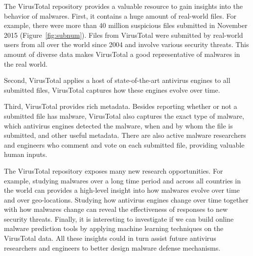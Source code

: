The VirusTotal repository provides a valuable resource to gain insights into 
the behavior of malwares.
%
First, it contains a huge amount of real-world files.
For example, there were more than 40 million suspicious files submitted in November 2015 (Figure~\ref{fig:subnum}). 
Files from VirusTotal were submitted by real-world users from all over the world since 2004
and involve various security threats. 
This amount of diverse data makes VirusTotal a good representative of malwares in the real world. 

Second, VirusTotal applies a host of state-of-the-art antivirus engines to all submitted files,
VirusTotal captures how these engines evolve over time.

Third, VirusTotal provides rich metadata. 
Besides reporting whether or not a submitted file has malware, 
VirusTotal also captures the exact type of malware, 
which antivirus engines detected the malware,
when and by whom the file is submitted,
and other useful metadata.
There are also active malware researchers and engineers
who comment and vote on each submitted file, 
providing valuable human inputs. 

The VirusTotal repository exposes many new research opportunities.
For example, studying malwares over a long time period and across all countries in the world 
can provides a high-level insight into how malwares evolve over time and over geo-locations.
Studying how antivirus engines change over time together with how malwares change can 
reveal the effectiveness of responses to new security threats.
Finally, it is interesting to investigate if we can build online malware prediction tools 
by applying machine learning techniques on the VirusTotal data.
All these insights could in turn assist future antivirus researchers and engineers
to better design malware defense mechanisms.

